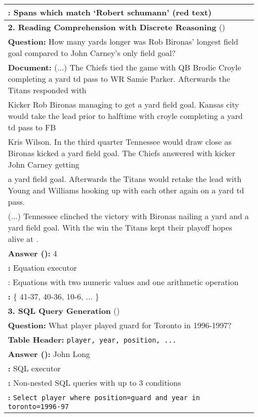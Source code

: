 \documentclass[11pt,a4paper]{article}
\begin{document}
\begin{table*}[tb]
\begin{tabulary}{\textwidth}{l}
        \textbf{:} Spans which match `Robert schumann' (red text) \\
    \midrule
        \textbf{2. Reading Comprehension with Discrete Reasoning} (\drop{}) \\
    \midrule
        \textbf{Question:} How many yards longer was Rob Bironas' longest field goal compared to John Carney's only field goal? \\
        \textbf{Document:} (...) The Chiefs tied the game with QB Brodie Croyle completing a  yard td pass to WR Samie Parker. Afterwards the Titans responded with \\ Kicker Rob Bironas managing to get a  yard field goal. Kansas city would take the lead prior to halftime with croyle completing a  yard td pass to FB \\ Kris Wilson. In the third  quarter Tennessee would draw close as Bironas kicked a  yard field goal. The Chiefs answered with kicker John Carney getting \\ a  yard field goal. Afterwards the Titans would retake the lead with Young and Williams hooking up with each other again on a  yard td pass. \\ (...) Tennessee clinched the victory with Bironas nailing a  yard and a  yard field goal. With the win the Titans kept their playoff hopes alive at . \\
        \textbf{Answer ():} 4 \\
        \textbf{:} Equation executor \\
        \textbf{}: Equations with two numeric values and one arithmetic operation \\ \textbf{:} \{ 41-37, 40-36, 10-6,  ... \} \\
    \midrule
        \textbf{3. SQL Query Generation} (\wikisql{}) \\
    \midrule
        \textbf{Question:} What player played guard for Toronto in 1996-1997? \\ \textbf{Table Header:} \texttt{player, year, position, ...}\\
        \textbf{Answer ():} John Long \\
        \textbf{:} SQL executor \\
        \textbf{:} Non-nested SQL queries with up to 3 conditions\\
        \textbf{:} \texttt{Select {player} where position=guard and year in toronto=1996-97} \\

\end{tabulary}
\end{table*}
\end{document}
